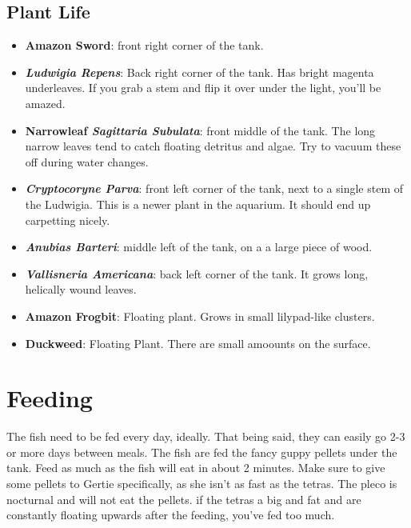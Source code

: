 \documentclass{report}
\begin{document}
\subsection{Plant Life}
\begin{itemize}
    \item \textbf{Amazon Sword}: front right corner of the tank.
    \item \textbf{\textit{Ludwigia Repens}}: Back right corner of the tank. Has bright magenta underleaves. If you grab a stem and 
    flip it over under the light, you'll be amazed.    
    \item \textbf{Narrowleaf \textit{Sagittaria Subulata}}: front middle of the tank. The long narrow leaves tend to catch 
    floating detritus and algae. Try to vacuum these off during water changes.
    \item \textbf{\textit{Cryptocoryne Parva}}: front left corner of the tank, next to a single stem of the Ludwigia. This is a newer plant in the aquarium. It should end up carpetting nicely. 
    \item \textbf{\textit{Anubias Barteri}}: middle left of the tank, on a a large piece of wood. 
    \item \textbf{\textit{Vallisneria Americana}}: back left corner of the tank. It grows long, helically wound leaves.
    \item \textbf{Amazon Frogbit}: Floating plant. Grows in small lilypad-like clusters.
    \item \textbf{Duckweed}: Floating Plant. There are small amoounts on the surface.
\end{itemize}

\section{Feeding}
The fish need to be fed every day, ideally. That being said, they can easily go 2-3 or more days between meals. The fish are
fed the fancy guppy pellets under the tank. Feed as much as the fish will eat in about 2 minutes. Make sure to give some
pellets to Gertie specifically, as she isn't as fast as the tetras. The pleco is nocturnal and will not eat the pellets. if the tetras a 
big and fat and are constantly floating upwards after the feeding, you've fed too much. 
\end{document}
